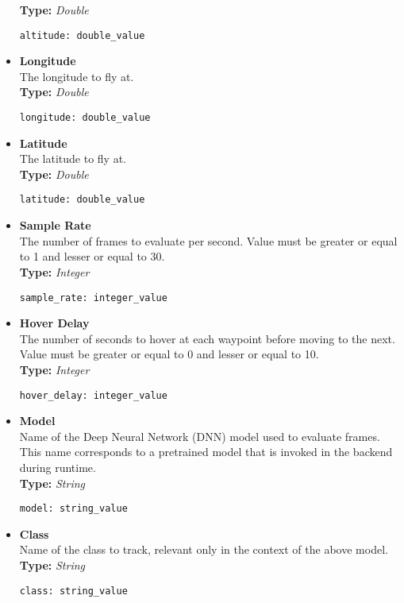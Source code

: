 \begin{itemize}
        \textbf{Type:} \textit{Double}
        \begin{lstlisting}[style=customgo]
        altitude: double_value
        \end{lstlisting}
        \item \textbf{Longitude}\\
        The longitude to fly at.\\
        \textbf{Type:} \textit{Double}
        \begin{lstlisting}[style=customgo]
        longitude: double_value
        \end{lstlisting}
        \item \textbf{Latitude} \\
        The latitude to fly at.\\
        \textbf{Type:} \textit{Double}
        \begin{lstlisting}[style=customgo]
        latitude: double_value
        \end{lstlisting}
        \item \textbf{Sample Rate} \\
        The number of frames to evaluate per second. Value must be greater or equal to 1 and lesser or equal to 30. \\
        \textbf{Type:} \textit{Integer}
        \begin{lstlisting}[style=customgo]
        sample_rate: integer_value
        \end{lstlisting}
        \item \textbf{Hover Delay} \\
        The number of seconds to hover at each waypoint before moving to the next. Value must be greater or equal to 0 and lesser or equal to 10. \\
        \textbf{Type:} \textit{Integer}
        \begin{lstlisting}[style=customgo]
        hover_delay: integer_value
        \end{lstlisting}
        \item \textbf{Model} \\
         Name of the Deep Neural Network (DNN) model used to evaluate frames. This name corresponds to a pretrained model that is invoked in the backend during runtime.\\
        \textbf{Type:} \textit{String}
        \begin{lstlisting}[style=customgo]
        model: string_value
        \end{lstlisting}
        \item \textbf{Class} \\
        Name of the class to track, relevant only in the context of the above model.\\
        \textbf{Type:} \textit{String}
        \begin{lstlisting}[style=customgo]
        class: string_value
        \end{lstlisting}

        
    \end{itemize}


